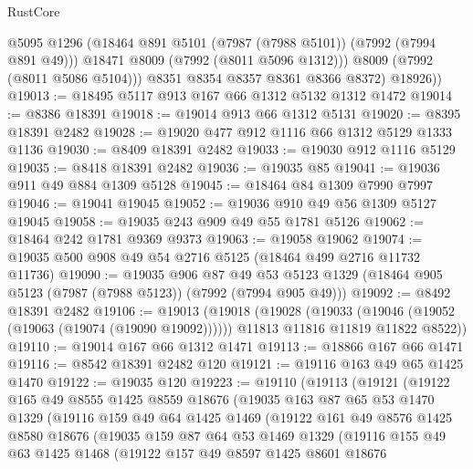 \begin{lexlean}{RustCore}
\begin{coremodule}
              @5095
              @1296
              (@18464 @891 @5101 (@7987 (@7988 @5101)) (@7992 (@7994 @891 @49)))
              @18471
              @8009
              (@7992 (@8011 @5096 @1312)))
            @8009
            (@7992 (@8011 @5086 @5104)))
          @8351
          @8354
          @8357
          @8361
          @8366
          @8372)
        @18926))
@19013 := @18495 @5117 @913 @167 @66 @1312 @5132 @1312 @1472
@19014 := @8386 @18391
@19018 := @19014 @913 @66 @1312 @5131
@19020 := @8395 @18391 @2482
@19028 := @19020 @477 @912 @1116 @66 @1312 @5129 @1333 @1136
@19030 := @8409 @18391 @2482
@19033 := @19030 @912 @1116 @5129
@19035 := @8418 @18391 @2482
@19036 := @19035 @85
@19041 := @19036 @911 @49 @884 @1309 @5128
@19045 := @18464 @84 @1309 @7990 @7997
@19046 := @19041 @19045
@19052 := @19036 @910 @49 @56 @1309 @5127 @19045
@19058 := @19035 @243 @909 @49 @55 @1781 @5126
@19062 := @18464 @242 @1781 @9369 @9373
@19063 := @19058 @19062
@19074 := @19035 @500 @908 @49 @54 @2716 @5125 (@18464 @499 @2716 @11732 @11736)
@19090 := @19035
    @906
    @87
    @49
    @53
    @5123
    @1329
    (@18464 @905 @5123 (@7987 (@7988 @5123)) (@7992 (@7994 @905 @49)))
@19092 := @8492 @18391 @2482
@19106 := @19013
    (@19018
      (@19028
        (@19033 (@19046 (@19052 (@19063 (@19074 (@19090 @19092))))))
        @11813
        @11816
        @11819
        @11822
        @8522))
@19110 := @19014 @167 @66 @1312 @1471
@19113 := @18866 @167 @66 @1471
@19116 := @8542 @18391 @2482 @120
@19121 := @19116 @163 @49 @65 @1425 @1470
@19122 := @19035 @120
@19223 := @19110
    (@19113
      (@19121
        (@19122
          @165
          @49
          @8555
          @1425
          @8559
          @18676
          (@19035
            @163
            @87
            @65
            @53
            @1470
            @1329
            (@19116
              @159
              @49
              @64
              @1425
              @1469
              (@19122
                @161
                @49
                @8576
                @1425
                @8580
                @18676
                (@19035
                  @159
                  @87
                  @64
                  @53
                  @1469
                  @1329
                  (@19116
                    @155
                    @49
                    @63
                    @1425
                    @1468
                    (@19122
                      @157
                      @49
                      @8597
                      @1425
                      @8601
                      @18676

\end{coremodule}
\end{lexlean}
